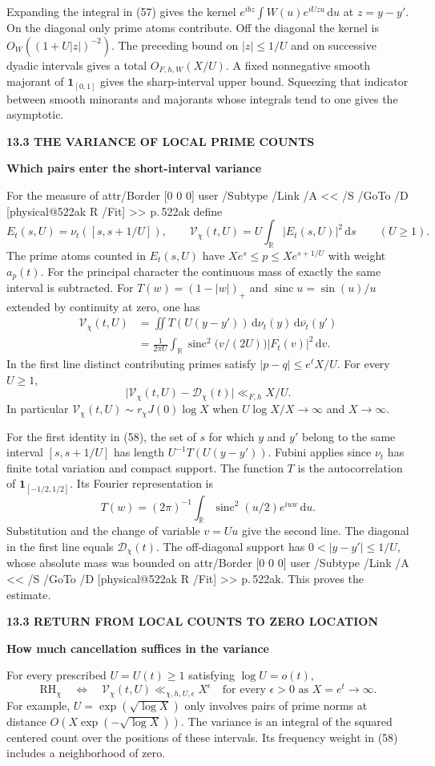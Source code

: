 \documentclass[11pt,letterpaper]{article}
\makeatletter
\newcommand{\rightmarktext}{}
\newcommand{\printfolio}{}
\newcommand{\leaf}[4]{\clearpage\gdef\printfolio{#1}\gdef\rightmarktext{#2}%
  {\small\sffamily\bfseries\color{ink}#3\par}\vspace{3pt}%
  {\LARGE\bfseries #4\par}\vspace{5pt}}
\newcommand{\R}{\mathbb R}
\newcommand{\dd}{\,\mathrm d}
\newcommand{\MusicPDFPageRef}[1]{\pdfpageref\csname physical@#1\endcsname\space\space 0 R}
\newcommand{\pagelink}[2]{\leavevmode\pdfstartlink attr{/Border [0 0 0]} user{%
  /Subtype /Link /A << /S /GoTo /D [\MusicPDFPageRef{#1} /Fit] >>}%
  {\color{ink}#2}\pdfendlink}
\newcommand{\pg}[1]{\pagelink{#1}{p.\,#1}}
\makeatother
\begin{document}
Expanding the integral in (57) gives the kernel
$e^{ibz}\int W(u)e^{iUzu}\dd u$ at $z=y-y'$. On the diagonal only
prime atoms contribute. Off the diagonal the kernel is
$O_W((1+U|z|)^{-2})$. The preceding bound on $|z|\le1/U$ and on
successive dyadic intervals gives a total $O_{F,h,W}(X/U)$.
A fixed nonnegative smooth majorant of $\mathbf1_{[0,1]}$ gives the
sharp-interval upper bound. Squeezing that indicator between smooth
minorants and majorants whose integrals tend to one gives the asymptotic.

\leaf{522al}{Counts in log intervals}{13.3 \quad THE VARIANCE OF LOCAL PRIME COUNTS}{Which pairs enter the short-interval variance}
For the measure of \pg{522ak} define
\[
 E_t(s,U)=\nu_t([s,s+1/U]),\qquad
 \mathcal V_\chi(t,U)=U\int_\R |E_t(s,U)|^2\dd s \qquad(U\ge1).
\]
The prime atoms counted in $E_t(s,U)$ have
$Xe^s\le p\le Xe^{s+1/U}$ with weight $a_p(t)$. For the principal
character the continuous mass of exactly the same interval is subtracted.
For $T(w)=(1-|w|)_+$ and $\operatorname{sinc} u=\sin(u)/u$ extended
by continuity at zero, one has
\begin{align*}
 \mathcal V_\chi(t,U)
 &=\iint T(U(y-y'))\,\mathrm d\nu_t(y)\,\mathrm d\overline{\nu_t}(y')\\
 &=\frac1{2\pi U}\int_\R
       \operatorname{sinc}^2\!\big(v/(2U)\big)|F_t(v)|^2\dd v .
 \tag{58}
\end{align*}
In the first line distinct contributing primes satisfy
$|p-q|\le e^\ell X/U$. For every $U\ge1$,
\[
 \big|\mathcal V_\chi(t,U)-\mathcal D_\chi(t)\big|\ll_{F,h} X/U .
\]
In particular $\mathcal V_\chi(t,U)\sim r_\chi J(0)\log X$ when
$U\log X/X\to\infty$ and $X\to\infty$.

For the first identity in (58), the set of $s$ for which $y$ and $y'$
belong to the same interval $[s,s+1/U]$ has length
$U^{-1}T(U(y-y'))$. Fubini applies since $\nu_t$ has finite total
variation and compact support. The function $T$ is the autocorrelation
of $\mathbf1_{[-1/2,1/2]}$. Its Fourier representation is
\[
 T(w)=(2\pi)^{-1}\int_\R\operatorname{sinc}^2(u/2)e^{iuw}\dd u .
\]
Substitution and the change of variable $v=Uu$ give the second line.
The diagonal in the first line equals $\mathcal D_\chi(t)$. The
off-diagonal support has $0<|y-y'|\le1/U$, whose absolute mass was
bounded on \pg{522ak}. This proves the estimate.

\leaf{522am}{A local variance criterion}{13.3 \quad RETURN FROM LOCAL COUNTS TO ZERO LOCATION}{How much cancellation suffices in the variance}
For every prescribed $U=U(t)\ge1$ satisfying $\log U=o(t)$,
\[
 \mathrm{RH}_\chi\quad\Longleftrightarrow\quad
 \mathcal V_\chi(t,U)\ll_{\chi,h,U,\epsilon} X^\epsilon
       \quad\text{for every }\epsilon>0\text{ as }X=e^t\to\infty .
 \tag{59}
\]
For example, $U=\exp(\sqrt{\log X})$ only involves pairs of prime
norms at distance $O(X\exp(-\sqrt{\log X}))$. The variance is an
integral of the squared centered count over the positions of these
intervals. Its frequency weight in (58) includes a neighborhood of zero.
\end{document}
